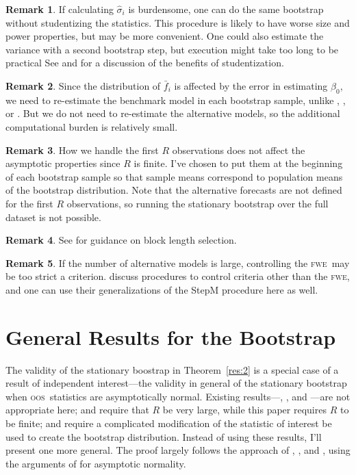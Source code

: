 \documentclass[12pt]{article}
\theoremstyle{definition}
\newtheorem{rem}{Remark}
\newcommand{\oos}{\textsc{oos}}
\newcommand{\fwe}{\textsc{fwe}}
\begin{document}
\begin{rem}
  If calculating $\hat{\sigma}_i$ is burdensome, one can do the same
  bootstrap without studentizing the statistics.  This procedure is
  likely to have worse size and power properties, but may be more
  convenient.  One could also estimate the variance with a second
  bootstrap step, but execution might take too long to be practical
  See \citet{Han:05} and \citet[Section~4.2]{RoW:05} for a discussion
  of the benefits of studentization.
\end{rem}

\begin{rem}
  Since the distribution of $\bar{f}_i$ is affected by the error in
  estimating $\beta_0$, we need to re-estimate the benchmark model
  in each bootstrap sample, unlike \citet{Whi:00}, \citet{Han:05}, or
  \citet{HuW:10}.  But we do not need to re-estimate the alternative
  models, so the additional computational burden is relatively small.
\end{rem}

\begin{rem}
  How we handle the first $R$ observations does not affect the
  asymptotic properties since $R$ is finite.  I've chosen to put them
  at the beginning of each bootstrap sample so that sample means
  correspond to population means of the bootstrap distribution.  Note
  that the alternative forecasts are not defined for the first $R$
  observations, so running the stationary bootstrap over the full
  dataset is not possible.
\end{rem}

\begin{rem}
  See \citet{RoW:05,RoW:06} for guidance on block length
  selection.
\end{rem}

\begin{rem}
  If the number of alternative models is large, controlling the \fwe\
  may be too strict a criterion.  \citet{RSW:08} discuss procedures to
  control criteria other than the \fwe, and one can use their
  generalizations of the StepM procedure here as well.
\end{rem}

\section{General Results for the Bootstrap}\label{sec:1b}
The validity of the stationary boostrap in Theorem~\ref{res:2} is a
special case of a result of independent interest---the validity in
general of the stationary bootstrap when \oos\ statistics are
asymptotically normal.  Existing results---\citet{Whi:00},
\citet{Han:05}, and \citet{CoS:07}---are not appropriate here;
\citet{Whi:00} and \citet{Han:05} require that $R$ be very large,
while this paper requires $R$ to be finite; and \citet{CoS:07} require
a complicated modification of the statistic of interest be used to
create the bootstrap distribution.  Instead of using these results,
I'll present one more general.  The proof largely follows the approach
of \citet{Wes:96}, \citet{WeM:98}, and \citet{Mcc:00}, using the
arguments of \citet{Cal:11d} for asymptotic normality.
\end{document}
